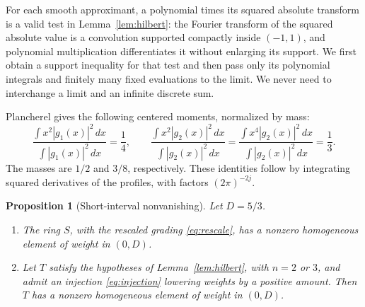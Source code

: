\documentclass[11pt]{article}
\newtheorem{proposition}[theorem]{Proposition}
\theoremstyle{definition}
\theoremstyle{remark}
\numberwithin{equation}{section}
\newcommand{\dd}{\,d}
\begin{document}
For each smooth approximant, a polynomial times its squared absolute transform is a valid test in Lemma~\ref{lem:hilbert}: the Fourier transform of the squared absolute value is a convolution supported compactly inside \((-1,1)\), and polynomial multiplication differentiates it without enlarging its support. We first obtain a support inequality for that test and then pass only its polynomial integrals and finitely many fixed evaluations to the limit. We never need to interchange a limit and an infinite discrete sum.

Plancherel gives the following centered moments, normalized by mass:
\begin{equation}\label{eq:basic-moments}
\frac{\int x^2|g_1(x)|^2\dd x}{\int |g_1(x)|^2\dd x}=\frac14,
\qquad
\frac{\int x^2|g_2(x)|^2\dd x}{\int |g_2(x)|^2\dd x}
=\frac{\int x^4|g_2(x)|^2\dd x}{\int |g_2(x)|^2\dd x}
=\frac13.
\end{equation}
The masses are \(1/2\) and \(3/8\), respectively. These identities follow by integrating squared derivatives of the profiles, with factors \((2\pi)^{-2j}\).

\begin{proposition}[Short-interval nonvanishing]\label{prop:short}
Let \(D=5/3\).
\begin{enumerate}[label=(\alph*)]
\item The ring \(S\), with the rescaled grading \eqref{eq:rescale}, has a nonzero homogeneous element of weight in \((0,D)\).
\item Let \(T\) satisfy the hypotheses of Lemma~\ref{lem:hilbert}, with \(n=2\) or \(3\), and admit an injection \eqref{eq:injection} lowering weights by a positive amount. Then \(T\) has a nonzero homogeneous element of weight in \((0,D)\).
\end{enumerate}
\end{proposition}
\end{document}
